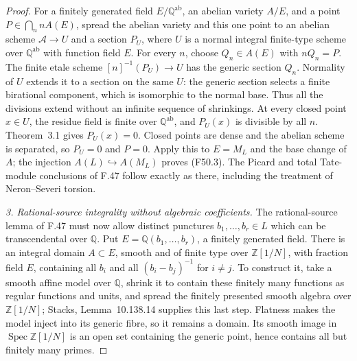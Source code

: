\begin{proof}
For a finitely generated field $E/\mathbb Q^{\mathrm{ab}}$, an
abelian variety $A/E$, and a point $P\in\bigcap_n nA(E)$, spread
the abelian variety and this one point to an abelian scheme
$\mathcal A\to U$ and a section $P_U$, where $U$ is a normal
integral finite-type scheme over $\mathbb Q^{\mathrm{ab}}$ with
function field $E$. For every $n$, choose $Q_n\in A(E)$ with
$nQ_n=P$. The finite etale scheme $[n]^{-1}(P_U)\to U$ has the
generic section $Q_n$. Normality of $U$ extends it to a section on
the same $U$: the generic section selects a finite birational
component, which is isomorphic to the normal base. Thus all the
divisions extend without an infinite sequence of shrinkings.
At every closed point $x\in U$, the residue field is finite over
$\mathbb Q^{\mathrm{ab}}$, and $P_U(x)$ is divisible by all $n$.
Theorem~3.1 gives $P_U(x)=0$. Closed points are dense and the
abelian scheme is separated, so $P_U=0$ and $P=0$.
Apply this to $E=M_L$ and the base change of $A$; the injection
$A(L)\hookrightarrow A(M_L)$ proves (F50.3). The Picard and total
Tate-module conclusions of F.47 follow exactly as there, including
the treatment of Neron--Severi torsion.

\emph{3. Rational-source integrality without algebraic coefficients.}
The rational-source lemma of F.47 must now allow distinct punctures
$b_1,\ldots,b_r\in L$ which can be transcendental over $\mathbb Q$.
Put $E=\mathbb Q(b_1,\ldots,b_r)$, a finitely generated field.
There is an integral domain $A\subset E$, smooth and of finite
type over $\mathbb Z[1/N]$, with fraction field $E$, containing
all $b_i$ and all $(b_i-b_j)^{-1}$ for $i\ne j$. To construct it,
take a smooth affine model over $\mathbb Q$, shrink it to contain
these finitely many functions as regular functions and units, and
spread the finitely presented smooth algebra over $\mathbb Z[1/N]$;
Stacks, Lemma~10.138.14 \cite{StacksSmoothSpread} supplies this
last step. Flatness makes the model inject into its generic fibre,
so it remains a domain. Its smooth image in
$\operatorname{Spec}\mathbb Z[1/N]$ is an open set containing the
generic point, hence contains all but finitely many primes.


\end{proof}
